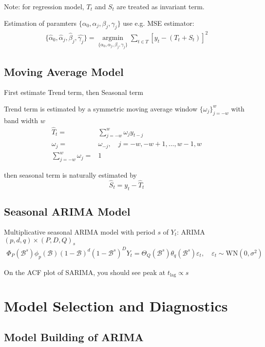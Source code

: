     Note: for regression model, $ T_t $ and $ S_t $ are treated as invariant term.

    Estimation of paramters $ \{\alpha _0,\alpha_j,\beta _j,\gamma _j\} $ use e.g. MSE estimator:
    \begin{align}
        \{\hat{\alpha }_0,\hat{\alpha }_j,\hat{\beta }_j,\hat{\gamma _j}\}=\mathop{\arg\min}\limits_{\{\alpha _0,\alpha_j,\beta _j,\gamma _j\}} \sum_{t\in T} \left[y_t-(T_t+S_t)\right]^2
    \end{align}


\subsection{Moving Average Model}
    First estimate Trend term, then Seasonal term

    Trend term is estimated by a symmetric moving average window $ \{\omega _j\}_{j=-w}^w $ with band width $ w $
    \begin{align}
        \hat{T}_t=&\sum_{j=-w}^w\omega _jy_{t-j}\\
        \omega _j=&\omega _{-j},\quad j=-w,-w+1,\ldots,w-1,w\\
        \sum_{j=-w}^w\omega _j=&1
    \end{align}
        
    then seasonal term is naturally estimated by 
    \[
        \hat{S}_t=y_t- \hat{T}_t
    \]
    
\subsection{Seasonal ARIMA Model}\label{SubSubSectionSARIMA}
    Multiplicative seasonal ARIMA model with period $ s $ of $ Y_t $: ARIMA$ (p,d,q)\times (P,D,Q)_s $
    \begin{align}
        \Phi _P(\mathscr{B} ^s)\phi _p(\mathscr{B} )(1-\mathscr{B} )^d(1-\mathscr{B} ^s)^DY_t=\Theta _Q(\mathscr{B} ^s)\theta _q(\mathscr{B} ^s)\varepsilon _t,\quad \varepsilon _t\sim \mathrm{WN}(0,\sigma ^2) 
    \end{align} 

    On the ACF plot of SARIMA, you should see peak at $ t_\mathrm{lag}\propto s  $
    
\section{Model Selection and Diagnostics}
\subsection{Model Building of ARIMA}

